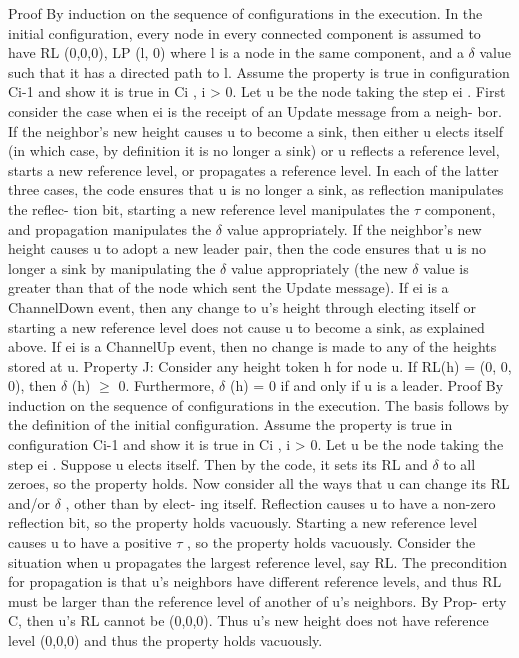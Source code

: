 Proof By induction on the sequence of configurations in the execution. In the initial configuration, every node in every connected component is assumed to have RL (0,0,0), LP (l, 0) where l is a node in the same component, and a $\delta$ value such that it has a directed path to l. Assume the property is true in configuration Ci-1 and show it is true in Ci , i > 0. Let u be the node taking the step ei . First consider the case when ei is the receipt of an Update message from a neigh- bor. If the neighbor’s new height causes u to become a sink, then either u elects itself (in which case, by definition it is no longer a sink) or u reflects a reference level, starts a new reference level, or propagates a reference level. In each of the latter three cases, the code ensures that u is no longer a sink, as reflection manipulates the reflec- tion bit, starting a new reference level manipulates the $\tau$ component, and propagation manipulates the $\delta$ value appropriately. If the neighbor’s new height causes u to adopt a new leader pair, then the code ensures that u is no longer a sink by manipulating the $\delta$ value appropriately (the new $\delta$ value is greater than that of the node which sent the Update message). If ei is a ChannelDown event, then any change to u’s height through electing itself or starting a new reference level does not cause u to become a sink, as explained above. If ei is a ChannelUp event, then no change is made to any of the heights stored at u. Property J: Consider any height token h for node u. If RL(h) = (0, 0, 0), then $\delta$ (h) $\geq$ 0. Furthermore, $\delta$ (h) = 0 if and only if u is a leader. Proof By induction on the sequence of configurations in the execution. The basis follows by the definition of the initial configuration. Assume the property is true in configuration Ci-1 and show it is true in Ci , i > 0. Let u be the node taking the step ei . Suppose u elects itself. Then by the code, it sets its RL and $\delta$ to all zeroes, so the property holds. Now consider all the ways that u can change its RL and/or $\delta$ , other than by elect- ing itself. Reflection causes u to have a non-zero reflection bit, so the property holds vacuously. Starting a new reference level causes u to have a positive $\tau$ , so the property holds vacuously. Consider the situation when u propagates the largest reference level, say RL. The precondition for propagation is that u’s neighbors have different reference levels, and thus RL must be larger than the reference level of another of u’s neighbors. By Prop- erty C, then u’s RL cannot be (0,0,0). Thus u’s new height does not have reference level (0,0,0) and thus the property holds vacuously.

